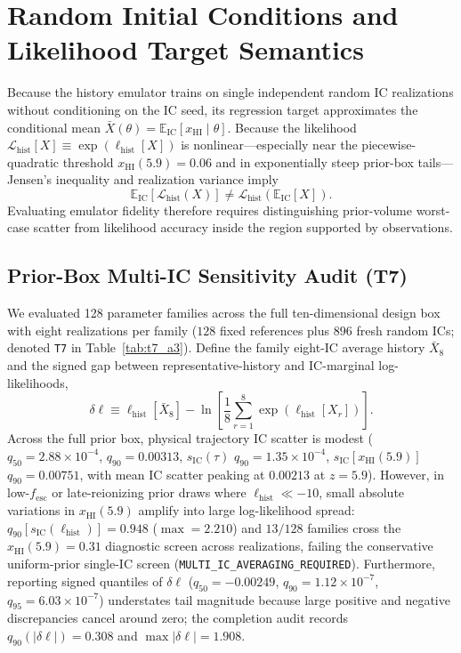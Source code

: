 \documentclass[aps,prd,reprint,superscriptaddress,nofootinbib,amsmath,amssymb,floatfix,longbibliography]{revtex4-2}
\begin{document}
\section{Random Initial Conditions and Likelihood Target Semantics}\label{sec:ic}

Because the history emulator trains on single independent random IC realizations without conditioning on the IC seed, its regression target approximates the conditional mean $\bar{X}(\theta) = \mathbb{E}_{\mathrm{IC}}[x_{\mathrm{HI}} \mid \theta]$. Because the likelihood $\mathcal{L}_{\mathrm{hist}}[X] \equiv \exp(\ell_{\mathrm{hist}}[X])$ is nonlinear---especially near the piecewise-quadratic threshold $x_{\mathrm{HI}}(5.9)=0.06$ and in exponentially steep prior-box tails---Jensen's inequality and realization variance imply
\begin{equation}
\mathbb{E}_{\mathrm{IC}}\!\left[\mathcal{L}_{\mathrm{hist}}(X)\right]
\neq \mathcal{L}_{\mathrm{hist}}\!\left(\mathbb{E}_{\mathrm{IC}}[X]\right).
\label{eq:jensen}
\end{equation}
Evaluating emulator fidelity therefore requires distinguishing prior-volume worst-case scatter from likelihood accuracy inside the region supported by observations.

\subsection{Prior-Box Multi-IC Sensitivity Audit (T7)}\label{sec:t7}

We evaluated 128 parameter families across the full ten-dimensional design box with eight realizations per family ($128$ fixed references plus $896$ fresh random ICs; denoted \texttt{T7} in Table~\ref{tab:t7_a3}). Define the family eight-IC average history $\bar{X}_8$ and the signed gap between representative-history and IC-marginal log-likelihoods,
\begin{equation}
\delta\ell \equiv \ell_{\mathrm{hist}}[\bar{X}_8] - \ln\!\left[\frac{1}{8}\sum_{r=1}^8 \exp\left(\ell_{\mathrm{hist}}[X_r]\right)\right].
\label{eq:deltal}
\end{equation}
Across the full prior box, physical trajectory IC scatter is modest ($q_{50}=2.88\times 10^{-4}$, $q_{90}=0.00313$, $s_{\mathrm{IC}}(\tau)$ $q_{90}=1.35\times 10^{-4}$, $s_{\mathrm{IC}}[x_{\mathrm{HI}}(5.9)]$ $q_{90}=0.00751$, with mean IC scatter peaking at $0.00213$ at $z=5.9$). However, in low-$f_{\mathrm{esc}}$ or late-reionizing prior draws where $\ell_{\mathrm{hist}} \ll -10$, small absolute variations in $x_{\mathrm{HI}}(5.9)$ amplify into large log-likelihood spread: $q_{90}[s_{\mathrm{IC}}(\ell_{\mathrm{hist}})] = 0.948$ ($\max = 2.210$) and $13/128$ families cross the $x_{\mathrm{HI}}(5.9)=0.31$ diagnostic screen across realizations, failing the conservative uniform-prior single-IC screen (\texttt{MULTI\_IC\_AVERAGING\_REQUIRED}). Furthermore, reporting signed quantiles of $\delta\ell$ ($q_{50}=-0.00249$, $q_{90}=1.12\times 10^{-7}$, $q_{95}=6.03\times 10^{-7}$) understates tail magnitude because large positive and negative discrepancies cancel around zero; the completion audit records $q_{90}(|\delta\ell|) = 0.308$ and $\max |\delta\ell| = 1.908$.
\end{document}
